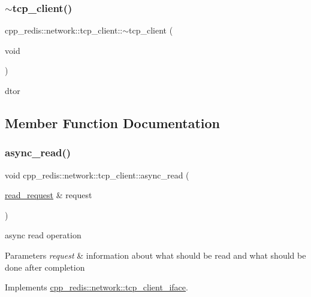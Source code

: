 \subsubsection{\texorpdfstring{$\sim$tcp\+\_\+client()}{~tcp\_client()}}
{\footnotesize\ttfamily cpp\+\_\+redis\+::network\+::tcp\+\_\+client\+::$\sim$tcp\+\_\+client (\begin{DoxyParamCaption}\item[{void}]{ }\end{DoxyParamCaption})\hspace{0.3cm}{\ttfamily [default]}}



dtor 



\subsection{Member Function Documentation}
\mbox{\label{classcpp__redis_1_1network_1_1tcp__client_a5eed4225fcd01e3108580d863c94c2cc}} 
\subsubsection{\texorpdfstring{async\+\_\+read()}{async\_read()}}
{\footnotesize\ttfamily void cpp\+\_\+redis\+::network\+::tcp\+\_\+client\+::async\+\_\+read (\begin{DoxyParamCaption}\item[{\hyperlink{structcpp__redis_1_1network_1_1tcp__client__iface_1_1read__request}{read\+\_\+request} \&}]{request }\end{DoxyParamCaption})\hspace{0.3cm}{\ttfamily [virtual]}}

async read operation


\begin{DoxyParams}{Parameters}
{\em request} & information about what should be read and what should be done after completion \\
\hline
\end{DoxyParams}


Implements \hyperlink{classcpp__redis_1_1network_1_1tcp__client__iface_ae1f9fa87002273a0caf340407bb68ade}{cpp\+\_\+redis\+::network\+::tcp\+\_\+client\+\_\+iface}.

